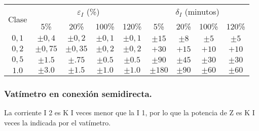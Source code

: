 				\begin{table}[H]
					\centering
					\begin{tabular}{|c|c|c|c|c||c|c|c|c|}
						\hline
						\multirow{2}{*}{Clase} & \multicolumn{4}{c||}{$\varepsilon_I$ (\%)} & \multicolumn{4}{c|}{$\delta_I$ (minutos)} \\
						\cline{2-9}
						& 5\% & 20\% & 100\% & 120\% & 5\% & 20\% & 100\% & 120\% \\
						\hline
						$0,1$ &$\pm0,4$ &$\pm0,2$ &$\pm0,1$ &$\pm0,1$ &$\pm15$ &$\pm8$ &$\pm5$ &$\pm5$ \\
						$0,2$ &$\pm0,75$& $\pm0,35$& $\pm0,2$& $\pm0,2$& $+30$ & $+15$ & $+10$ & $+10$ \\ 
						$0,5$ & $\pm1.5$ & $\pm.75$ & $\pm0.5$ & $\pm0.5$ & $\pm90$ & $\pm45$ & $\pm30$ & $\pm30$ \\ 
						$1.0$ & $\pm3.0$ & $\pm1.5$ & $\pm1.0$ & $\pm1.0$ & $\pm180$ & $\pm90$ & $\pm60$ & $\pm60$ \\
						\hline
					\end{tabular}
				\end{table}
				
			\subsubsection*{Vatímetro en conexión semidirecta.}
				La corriente I 2 es K I veces menor que la I 1, por lo que la
				potencia de Z es K I veces la indicada por el vatímetro.
			
